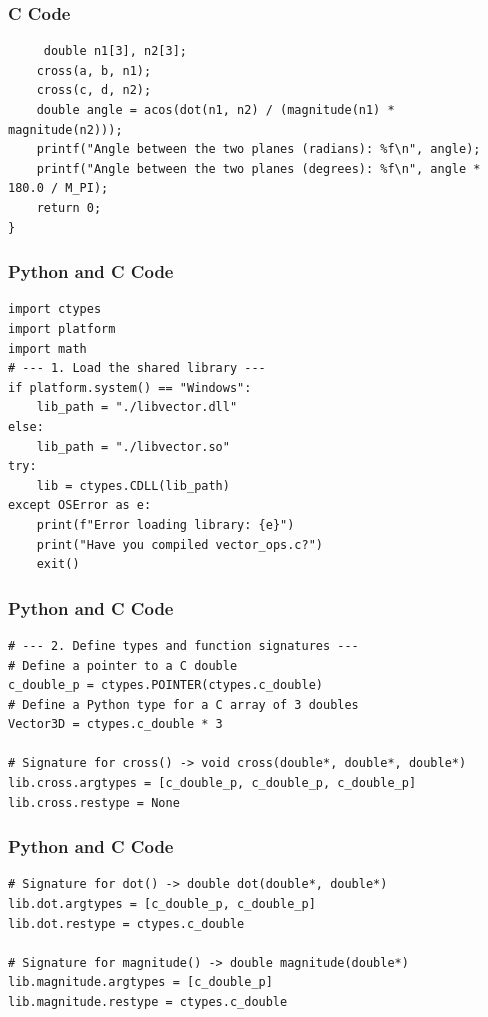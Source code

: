 \documentclass{beamer}
\begin{document}
\begin{frame}[fragile]
\frametitle{C Code}
\begin{lstlisting}
     double n1[3], n2[3];
    cross(a, b, n1);
    cross(c, d, n2);
    double angle = acos(dot(n1, n2) / (magnitude(n1) * magnitude(n2)));
    printf("Angle between the two planes (radians): %f\n", angle);
    printf("Angle between the two planes (degrees): %f\n", angle * 180.0 / M_PI);
    return 0;
}
\end{lstlisting}
\end{frame}

\begin{frame}[fragile]
\frametitle{Python and C Code}

\begin{lstlisting}
import ctypes
import platform
import math
# --- 1. Load the shared library ---
if platform.system() == "Windows":
    lib_path = "./libvector.dll"
else:
    lib_path = "./libvector.so"
try:
    lib = ctypes.CDLL(lib_path)
except OSError as e:
    print(f"Error loading library: {e}")
    print("Have you compiled vector_ops.c?")
    exit()
\end{lstlisting}
\end{frame}

\begin{frame}[fragile]
\frametitle{Python and C Code}

\begin{lstlisting}
# --- 2. Define types and function signatures ---
# Define a pointer to a C double
c_double_p = ctypes.POINTER(ctypes.c_double)
# Define a Python type for a C array of 3 doubles
Vector3D = ctypes.c_double * 3

# Signature for cross() -> void cross(double*, double*, double*)
lib.cross.argtypes = [c_double_p, c_double_p, c_double_p]
lib.cross.restype = None
\end{lstlisting}
\end{frame}

\begin{frame}[fragile]
\frametitle{Python and C Code}

\begin{lstlisting}
# Signature for dot() -> double dot(double*, double*)
lib.dot.argtypes = [c_double_p, c_double_p]
lib.dot.restype = ctypes.c_double

# Signature for magnitude() -> double magnitude(double*)
lib.magnitude.argtypes = [c_double_p]
lib.magnitude.restype = ctypes.c_double

\end{lstlisting}
\end{frame}
\end{document}
